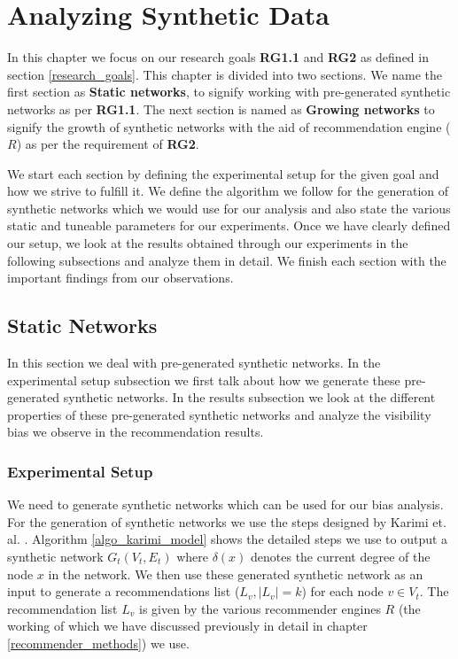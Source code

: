 \chapter{Analyzing Synthetic Data}
\label{analysis_chapter}
\thispagestyle{empty}

In this chapter we focus on our research goals \textbf{RG1.1} and \textbf{RG2} as defined in section \ref{research_goals}. This chapter is divided into two sections. We name the first section as \textbf{Static networks}, to signify working with pre-generated synthetic networks as per \textbf{RG1.1}. The next section is named as \textbf{Growing networks} to signify the growth of synthetic networks with the aid of recommendation engine ($R$) as per the requirement of \textbf{RG2}.

We start each section by defining the experimental setup for the given goal and how we strive to fulfill it. We define the algorithm we follow for the generation of synthetic networks which we would use for our analysis and also state the various static and tuneable parameters for our experiments. Once we have clearly defined our setup, we look at the results obtained through our experiments in the following subsections and analyze them in detail. We finish each section with the important findings from our observations.

\section{Static Networks}
\label{static_networks}
In this section we deal with pre-generated synthetic networks. In the experimental setup subsection we first talk about how we generate these pre-generated synthetic networks. In the results subsection we look at the different properties of these pre-generated synthetic networks and analyze the visibility bias we observe in the recommendation results.

\subsection{Experimental Setup}
We need to generate synthetic networks which can be used for our bias analysis. For the generation of synthetic networks we use the steps designed by Karimi et. al. \cite{karimi2018homophily}. Algorithm \ref{algo_karimi_model} shows the detailed steps we use to output a synthetic network $G_{t}(V_{t},E_{t})$ where $\delta(x)$ denotes the current degree of the node $x$ in the network. We then use these generated synthetic network as an input to generate a recommendations list ($L_{v}, |L_{v}|=k$) for each node $v \in V_t$. The recommendation list $L_{v}$ is given by the various recommender engines $R$ (the working of which we have discussed previously in detail in chapter \ref{recommender_methods}) we use.

